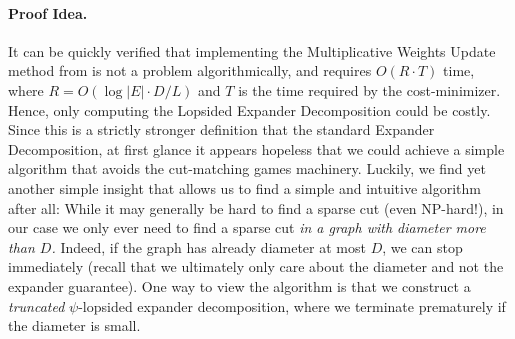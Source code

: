 \paragraph{Proof Idea.}
It can be quickly verified that implementing the Multiplicative Weights Update method from  is not a problem algorithmically, and requires $O(R \cdot T)$ time, where $R=O(\log |E| \cdot D/L)$ and $T$ is the time required by the cost-minimizer. Hence, only computing the Lopsided Expander Decomposition could be costly. Since this is a strictly stronger definition that the standard Expander Decomposition, at first glance it appears hopeless that we could achieve a simple algorithm that avoids the cut-matching games machinery. Luckily, we find yet another simple insight that allows us to find a simple and intuitive algorithm after all: While it may generally be hard to find a sparse cut (even NP-hard!), in our case we only ever need to find a sparse cut \emph{in a graph with diameter more than $D$.} Indeed, if the graph has already diameter at most $D$, we can stop immediately (recall that we ultimately only care about the diameter and not the expander guarantee). One way to view the algorithm is that we construct a \emph{truncated} $\psi$-lopsided expander decomposition, where we terminate prematurely if the diameter is small.


